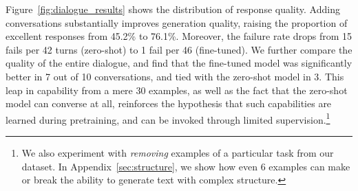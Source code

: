 Figure~\ref{fig:dialogue_results} shows the distribution of response quality.
Adding conversations substantially improves generation quality, raising the proportion of excellent responses from 45.2\% to 76.1\%.
Moreover, the failure rate drops from 15 fails per 42 turns (zero-shot) to 1 fail per 46 (fine-tuned).
We further compare the quality of the entire dialogue, and find that the fine-tuned model was significantly better in 7 out of 10 conversations, and tied with the zero-shot model in 3.
This leap in capability from a mere 30 examples, as well as the fact that the zero-shot model can converse at all, reinforces the hypothesis that such capabilities are learned during pretraining, and can be invoked through limited supervision.\footnote{We also experiment with \textit{removing} examples of a particular task from our dataset. In Appendix~\ref{sec:structure}, we show how even 6 examples can make or break the ability to generate text with complex structure.}




